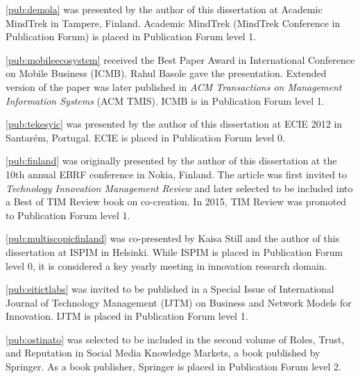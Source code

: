 \begin{midsloppypar}
\ref{pub:demola} was presented by the author of this dissertation at Academic MindTrek in Tampere, Finland. Academic MindTrek (MindTrek Conference in Publication Forum) is placed in Publication Forum level 1.

\ref{pub:mobileecosystem} received the Best Paper Award in International Conference on Mobile Business (ICMB). Rahul Basole gave the presentation. Extended version of the paper was later published in \emph{ACM Transactions on Management Information Systems} (ACM TMIS). ICMB is in Publication Forum level 1.

\ref{pub:tekesyic} was presented by the author of this dissertation at ECIE 2012 in Santarém, Portugal. ECIE is placed in Publication Forum level 0.

\ref{pub:finland} was originally presented by the author of this dissertation at the 10th annual EBRF conference in Nokia, Finland. The article was first invited to \emph{Technology Innovation Management Review} and later selected to be included into a Best of TIM Review book on co-creation. In 2015, TIM Review was promoted to Publication Forum level 1.

\ref{pub:multiscopicfinland} was co-presented by Kaisa Still and the author of this dissertation at ISPIM in Helsinki. While ISPIM is placed in Publication Forum level 0, it is considered a key yearly meeting in innovation research domain.

\ref{pub:eitictlabs} was invited to be published in a Special Issue of International Journal of Technology Management (IJTM) on Business and Network Models for Innovation. IJTM is placed in Publication Forum level 1.

\ref{pub:ostinato} was selected to be included in the second volume of Roles, Trust, and Reputation in Social Media Knowledge Markets, a book published by Springer. As a book publisher, Springer is placed in Publication Forum level 2.

\end{midsloppypar}